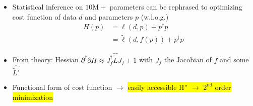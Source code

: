 \documentclass[aspectratio=169,xcolor=dvipsnames]{beamer}
\begin{document}
\begin{frame}
	\frametitle{\insertsection}
	\framesubtitle{\insertsubsection}

	\begin{itemize}
		\item Statistical inference on $10\mathrm{M}+$ parameters can be rephrased to optimizing cost function of data $d$ and parameters $p$ (w.l.o.g.)
		\begin{align*}
			H(p) &= \ell(d, p) + p^\dagger p
			\\ &= \tilde{\ell}(d, f(p)) + p^\dagger p
		\end{align*}
		\pause
		\item From theory: Hessian $\partial^\dagger \partial H \approx J_{f}^\dagger \widehat{\tilde{L}} J_{f} + 1$ with $J_{f}$ the Jacobian of $f$ and some $\widehat{\tilde{L}'}$
		\pause
		\item Functional form of cost function $\rightarrow$ \colorbox{yellow}{easily accessible H'' $\rightarrow$ $2^\text{nd}$ order minimization}
	\end{itemize}

\end{frame}
\end{document}
